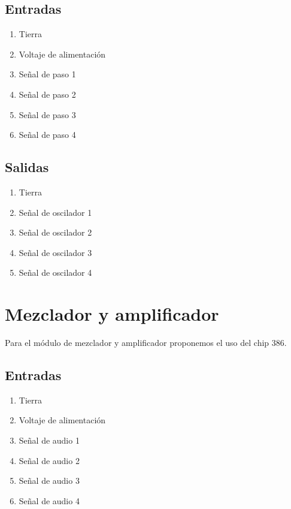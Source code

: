 \documentclass[../principal.tex]{subfiles}
\begin{document}
\subsection{Entradas}


\begin{enumerate}
    \item Tierra
    \item Voltaje de alimentación
    \item Señal de paso 1
    \item Señal de paso 2
    \item Señal de paso 3
    \item Señal de paso 4
\end{enumerate}

\subsection{Salidas}

\begin{enumerate}
    \item Tierra
    \item Señal de oscilador 1
    \item Señal de oscilador 2
    \item Señal de oscilador 3
    \item Señal de oscilador 4
\end{enumerate}

\newpage

\section{Mezclador y amplificador}

Para el módulo de mezclador y amplificador proponemos el uso del chip 386.

\subsection{Entradas}

\begin{enumerate}
    \item Tierra
    \item Voltaje de alimentación
    \item Señal de audio 1
    \item Señal de audio 2
    \item Señal de audio 3
    \item Señal de audio 4
\end{enumerate}
\end{document}
